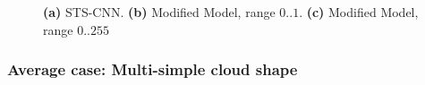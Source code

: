 \begin{figure}[h!]
	\centering

	\centering
	\caption{
		\textbf{(a)} STS-CNN.
		\textbf{(b)} Modified Model, range $0..1$.
		\textbf{(c)} Modified Model, range $0..255$}
\end{figure}


\subsubsection{Average case: Multi-simple cloud shape}

